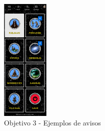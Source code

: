 \newpage

\begin{figure}[ht]
	\centering
	\includegraphics[width=0.2\textwidth]{imagenes/secciones/padawan/home.png}
	\caption{Objetivo 3 - Ejemplos de avisos}
	\label{objetivoIm3}
\end{figure}

